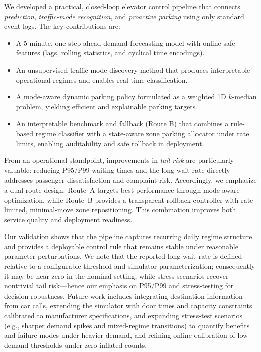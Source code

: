 
We developed a practical, closed-loop elevator control pipeline that connects \emph{prediction}, \emph{traffic-mode recognition},
and \emph{proactive parking} using only standard event logs. The key contributions are:

\begin{itemize}
    \item A 5-minute, one-step-ahead demand forecasting model with online-safe features (lags, rolling statistics, and cyclical time encodings).
    \item An unsupervised traffic-mode discovery method that produces interpretable operational regimes and enables real-time classification.
    \item A mode-aware dynamic parking policy formulated as a weighted 1D $k$-median problem, yielding efficient and explainable parking targets.
    \item An interpretable benchmark and fallback (Route B) that combines a rule-based regime classifier with a state-aware zone parking allocator under rate limits, enabling auditability and safe rollback in deployment.
\end{itemize}

From an operational standpoint, improvements in \emph{tail risk} are particularly valuable: reducing P95/P99 waiting times and the long-wait
rate directly addresses passenger dissatisfaction and complaint risk. Accordingly, we emphasize a dual-route design: Route~A targets best
performance through mode-aware optimization, while Route~B provides a transparent rollback controller with rate-limited, minimal-move zone
repositioning. This combination improves both service quality and deployment readiness.

Our validation shows that the pipeline captures recurring daily regime structure and provides a deployable control rule that remains stable
under reasonable parameter perturbations. We note that the reported long-wait rate is defined relative to a configurable threshold and simulator parameterization; consequently it may be near zero in the nominal setting, while stress scenarios recover nontrivial tail risk—hence our emphasis on P95/P99 and stress-testing for decision robustness.
Future work includes integrating destination information from car calls, extending the simulator with
door times and capacity constraints calibrated to manufacturer specifications, and expanding stress-test scenarios (e.g., sharper demand spikes and mixed-regime transitions) to quantify benefits and failure modes under heavier demand, and refining online calibration of low-demand thresholds under zero-inflated counts.


